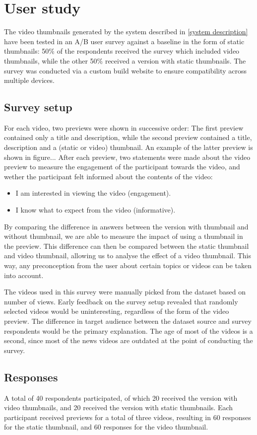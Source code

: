 \documentclass{../resources/acm_proc_article-sp}
\begin{document}
\section{User study}
The video thumbnails generated by the system described in \ref{system description} have been tested in an A/B user survey against a baseline in the form of static thumbnails: 50\% of the respondents received the survey which included video thumbnails, while the other 50\% received a version with static thumbnails. The survey was conducted via a custom build website to ensure compatibility across multiple devices.

\subsection{Survey setup}

For each video, two previews were shown in successive order: The first preview contained only a title and description, while the second preview contained a title, description and a (static or video) thumbnail. An example of the latter preview is shown in figure... %
After each preview, two statements were made about the video preview to measure the engagement of the participant towards the video, and wether the participant felt informed about the contents of the video:

\begin{itemize}
	\item I am interested in viewing the video (engagement).
	\item I know what to expect from the video (informative).
\end{itemize}

By comparing the difference in answers between the version with thumbnail and without thumbnail, we are able to measure the impact of using a thumbnail in the preview. This difference can then be compared between the static thumbnail and video thumbnail, allowing us to analyse the effect of a video thumbnail. This way, any preconception from the user about certain topics or videos can be taken into account.

The videos used in this survey were manually picked from the dataset based on number of views. Early feedback on the survey setup revealed that randomly selected videos would be uninteresting, regardless of the form of the video preview. The difference in target audience between the dataset source and survey respondents would be the primary explanation. The age of most of the videos is a second, since most of the news videos are outdated at the point of conducting the survey.

\subsection{Responses}

A total of 40 respondents participated, of which 20 received the version with video thumbnails, and 20 received the version with static thumbnails. Each participant received previews for a total of three videos, resulting in 60 responses for the static thumbnail, and 60 responses for the video thumbnail.
\end{document}
